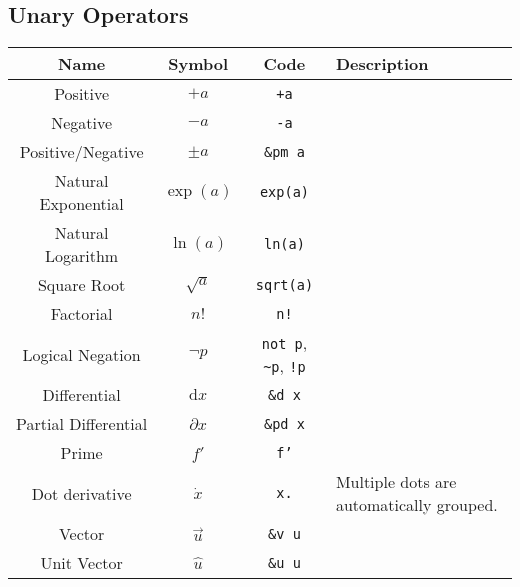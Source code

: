 \documentclass{article}
\begin{document}
  \newpage
  
  \subsection{Unary Operators} %
  \label{sub:unary_ops}
  \begin{table}[!h]
    \centering
    \begin{tabular}{|c|c|c|l|}
      \hline
      \textbf{Name} & \textbf{Symbol} & \textbf{Code} & \textbf{Description} \\
      \hline\hline
      
      Positive & \( +a \) & \texttt{+a} & \\
      Negative & \( -a \) & \texttt{-a} & \\
      Positive/Negative & \( \pm a \) & \texttt{\&pm a} & \\
      Natural Exponential & \( \exp(a) \) & \texttt{exp(a)} & \\
      Natural Logarithm & \( \ln(a) \) & \texttt{ln(a)} & \\
      Square Root & \( \sqrt{a} \) & \texttt{sqrt(a)} & \\
      Factorial & \( n! \) & \texttt{n!} & \\
      Logical Negation & \( \neg p \) & \texttt{not p}, \texttt{\~{}p}, \texttt{!p} & \\
      Differential & \( \mathrm{d}x \) & \texttt{\&d x} & \\
      Partial Differential & \( \partial x \) & \texttt{\&pd x} & \\
      Prime & \( f' \) & \texttt{f'} & \\
      Dot derivative & \( \dot{x} \) & \texttt{x.} & Multiple dots are automatically grouped. \\
      Vector & \( \vec{u} \) & \texttt{\&v u} & \\
      Unit Vector & \( \hat{u} \) & \texttt{\&u u} & \\
      \hline
    \end{tabular}
  \end{table}
  
\end{document}
